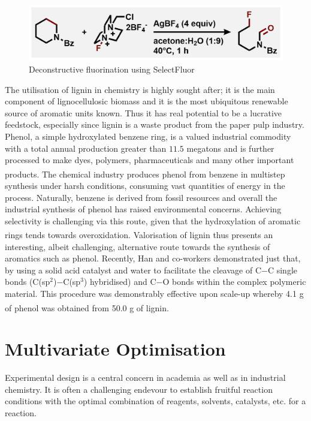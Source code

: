 \begin{figure}[hbt!]
\centering
\begin{minipage}{\textwidth}
   \centering
   \includegraphics[height=2.5cm]{gfx/sarpong1} %
   \caption{Deconstructive fluorination using SelectFluor}
   \label{fig:sarpong1}
\end{minipage}\hfill
\end{figure}

The utilisation of lignin in chemistry is highly sought after; it is the main component of lignocellulosic biomass and it is the most ubiquitous renewable source of aromatic units known. Thus it has real potential to be a lucrative feedstock, especially since lignin is a waste product from the paper pulp industry. Phenol, a simple hydroxylated benzene ring, is a valued industrial commodity with a total annual production greater than $11.5$ megatons and is further processed to make dyes, polymers, pharmaceuticals and many other important products.\textsuperscript{\cite{morimoto:2015}} The chemical industry produces phenol from benzene in multistep synthesis under harsh conditions, consuming vast quantities of energy in the process. Naturally, benzene is derived from fossil resources and overall the industrial synthesis of phenol has raised environmental concerns. Achieving selectivity is challenging via this route, given that the hydroxylation of aromatic rings tends towards overoxidation.\textsuperscript{\cite{zhu:2019}} Valorisation of lignin thus presents an interesting, albeit challenging, alternative route towards the synthesis of aromatics such as phenol. Recently, Han and co-workers demonstrated just that, by using a solid acid catalyst and water to facilitate the cleavage of C$-$C single bonds (C(sp$^2$)$-$C(sp$^3$) hybridised) and C$-$O bonds within the complex polymeric material. This procedure was demonstrably effective upon scale-up whereby 4.1 g of phenol was obtained from 50.0 g of lignin.\textsuperscript{\cite{yan:2020}}

\section{Multivariate Optimisation}

\noindent Experimental design is a central concern in academia as well as in industrial chemistry. It is often a challenging endevour to establish fruitful reaction conditions with the optimal combination of reagents, solvents, catalysts, etc. for a reaction.

